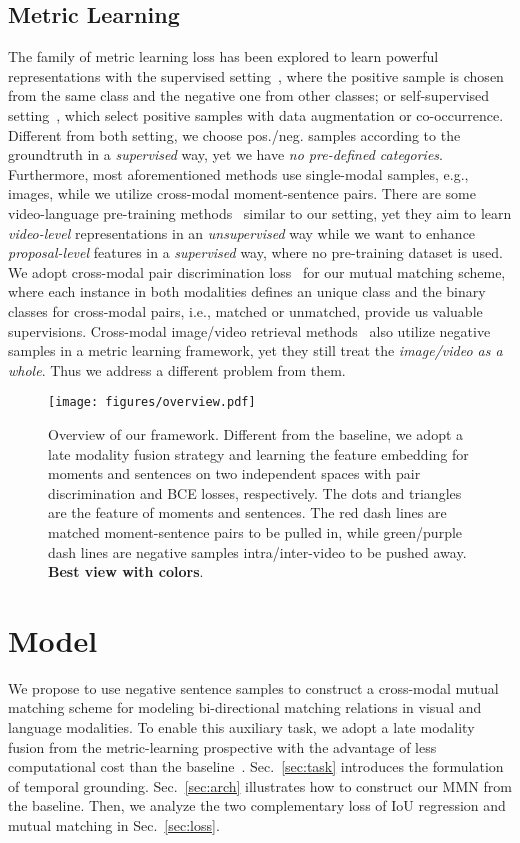 \documentclass[letterpaper]{article} \usepackage{aaai22}  \usepackage{times}  \usepackage{helvet}  \usepackage{courier}  \usepackage[hyphens]{url}  \usepackage{graphicx} \urlstyle{rm} \def\UrlFont{\rm}  \usepackage{natbib}  \usepackage{caption} \DeclareCaptionStyle{ruled}{labelfont=normalfont,labelsep=colon,strut=off} \frenchspacing  \setlength{\pdfpagewidth}{8.5in}  \setlength{\pdfpageheight}{11in}  \usepackage{algorithm}
\newcommand{\figOVERVIEW}{
    \begin{figure*}[t]
        \begin{center}
        \texttt{[image: figures/overview.pdf]}
        \end{center}
           \caption{Overview of our framework. Different from the baseline, we adopt a late modality fusion strategy and learning the feature embedding for moments and sentences on two independent spaces with pair discrimination and BCE losses, respectively. The dots and triangles are the feature of moments and sentences. The red dash lines are matched moment-sentence pairs to be pulled in, while green/purple dash lines are negative samples intra/inter-video to be pushed away. {\bf Best view with colors}.}
        \label{fig:overview}
\end{figure*}
}
\begin{document}
\subsection{Metric Learning}
The family of metric learning loss has been explored to learn powerful representations with the supervised setting~\cite{DBLP:conf/cvpr/HadsellCL06,DBLP:conf/nips/KhoslaTWSTIMLK20}, where the positive sample is chosen from the same class and the negative one from other classes; or self-supervised setting~\cite{DBLP:conf/cvpr/WuXYL18,DBLP:conf/icml/ChenK0H20,DBLP:conf/cvpr/He0WXG20}, which select positive samples with data augmentation or co-occurrence. Different from both setting, we choose pos./neg. samples according to the groundtruth in a {\em supervised} way, yet we have {\em no pre-defined categories}. Furthermore, most aforementioned methods use single-modal samples, e.g., images, while we utilize cross-modal moment-sentence pairs. There are some video-language pre-training methods~\cite{DBLP:journals/corr/abs-2001-05691,DBLP:conf/cvpr/MiechASLSZ20} similar to our setting, yet they aim to learn {\em video-level} representations in an {\em unsupervised} way while we want to enhance {\em proposal-level} features in a {\em supervised} way, where no pre-training dataset is used. We adopt cross-modal pair discrimination loss~\cite{DBLP:journals/corr/abs-2001-05691} for our mutual matching scheme, where each instance in both modalities defines an unique class and the binary classes for cross-modal pairs, i.e., matched or unmatched, provide us valuable supervisions. Cross-modal image/video retrieval methods~\cite{DBLP:conf/cvpr/WangLL16,DBLP:conf/eccv/Gabeur0AS20} also utilize negative samples in a metric learning framework, yet they still treat the {\em image/video as a whole}. Thus we address a different problem from them.
\figOVERVIEW

\section{Model}
We propose to use negative sentence samples to construct a cross-modal mutual matching scheme for modeling bi-directional matching relations in visual and language modalities. To enable this auxiliary task, we adopt a late modality fusion from the metric-learning prospective with the advantage of less computational cost than the baseline~\cite{DBLP:conf/aaai/ZhangPFL20}. Sec.~\ref{sec:task} introduces the formulation of temporal grounding. Sec.~\ref{sec:arch} illustrates how to construct our MMN from the baseline. Then, we analyze the two complementary loss of IoU regression and mutual matching in Sec.~\ref{sec:loss}.
\end{document}
